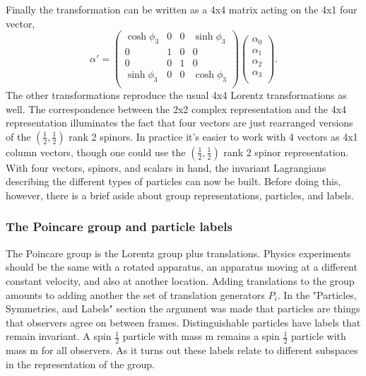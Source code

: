 \documentclass[12pt]{article}
\begin{document}
Finally the transformation can be written as a 4x4 matrix acting on the 4x1 four vector,
\begin{equation}
\alpha' = 
\begin{pmatrix}
\cosh\phi_3 & 0 & 0 & \sinh\phi_3 \\
0 & 1 & 0 & 0 \\
0 & 0 & 1 & 0 \\
\sinh\phi_3 & 0 & 0 & \cosh\phi_3 \\
\end{pmatrix}
\begin{pmatrix}
\alpha_0 \\
\alpha_1 \\
\alpha_2 \\
\alpha_3 \\
\end{pmatrix}.
\end{equation}
The other transformations reproduce the usual 4x4 Lorentz transformations as well. The correspondence between the 2x2 complex representation and the 4x4 representation illuminates the fact that four vectors are just rearranged versions of the $(\frac{1}{2}, \frac{1}{2})$ rank 2 spinors. In practice it's easier to work with 4 vectors as 4x1 column vectors, though one could use the $(\frac{1}{2}, \frac{1}{2})$ rank 2 spinor representation. With four vectors, spinors, and scalars in hand, the invariant Lagrangians describing the different types of particles can now be built. Before doing this, however, there is a brief aside about group representations, particles, and labels.

\subsubsection{The Poincare group and particle labels}

The Poincare group is the Lorentz group plus translations. Physics experiments should be the same with a rotated apparatus, an apparatus moving at a different constant velocity, and also at another location. Adding translations to the group amounts to adding another the set of translation generators $P_i$. In the "Particles, Symmetries, and Labels" section the argument was made that particles are things that observers agree on between frames. Distinguishable particles have labels that remain invariant. A spin $\frac{1}{2}$ particle with mass m remains a spin $\frac{1}{2}$ particle with mass m for all observers. As it turns out these labels relate to different subspaces in the representation of the group.
\end{document}
